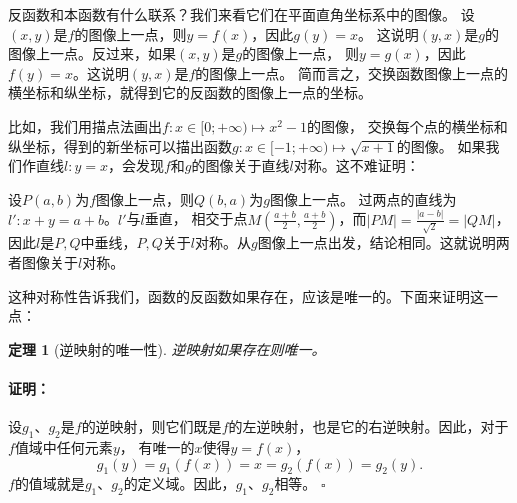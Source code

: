 \documentclass[12pt,UTF8]{ctexbook}
\newtheorem{tm}{定理}[section]
\renewenvironment{proof}{\paragraph{\textbf{证明：}}}{\hfill$\square$}
\begin{document}
反函数和本函数有什么联系？我们来看它们在平面直角坐标系中的图像。
设$(x, y)$是$f$的图像上一点，则$y = f(x)$，因此$g(y) = x$。
这说明$(y, x)$是$g$的图像上一点。反过来，如果$(x,y)$是$g$的图像上一点，
则$y = g(x)$，因此$f(y) = x$。这说明$(y, x)$是$f$的图像上一点。
简而言之，交换函数图像上一点的横坐标和纵坐标，就得到它的反函数的图像上一点的坐标。

比如，我们用描点法画出$f: x\in[0;+\infty) \mapsto x^2 - 1$的图像，
交换每个点的横坐标和纵坐标，得到的新坐标可以描出函数$g:x\in[-1;+\infty)\mapsto\sqrt{x + 1}$的图像。
如果我们作直线$l: y = x$，会发现$f$和$g$的图像关于直线$l$对称。这不难证明：

设$P(a,b)$为$f$图像上一点，则$Q(b,a)$为$g$图像上一点。
过两点的直线为$l':x + y = a + b$。$l'$与$l$垂直，
相交于点$M(\frac{a+b}{2}, \frac{a+b}{2})$，而$|PM| = \frac{|a-b|}{\sqrt{2}} = |QM|$，
因此$l$是$P,Q$中垂线，$P,Q$关于$l$对称。从$g$图像上一点出发，结论相同。这就说明两者图像关于$l$对称。

这种对称性告诉我们，函数的反函数如果存在，应该是唯一的。下面来证明这一点：

\begin{tm}[逆映射的唯一性]
    逆映射如果存在则唯一。
\end{tm}
\begin{proof}
    设$g_1$、$g_2$是$f$的逆映射，则它们既是$f$的左逆映射，也是它的右逆映射。因此，对于$f$值域中任何元素$y$，
    有唯一的$x$使得$y = f(x)$，
    $$ g_1(y) = g_1(f(x)) = x = g_2(f(x)) = g_2(y).$$
    $f$的值域就是$g_1$、$g_2$的定义域。因此，$g_1$、$g_2$相等。
\end{proof}
\end{document}
